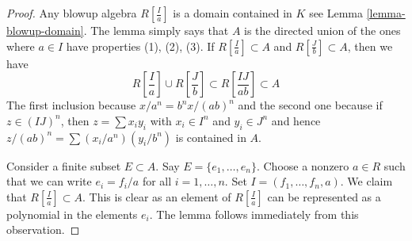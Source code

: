 \begin{proof}
Any blowup algebra $R[\frac{I}{a}]$ is a domain contained in $K$ see
Lemma \ref{lemma-blowup-domain}. The lemma simply says that $A$ is the
directed union of the ones where $a \in I$ have properties (1), (2), (3).
If $R[\frac{I}{a}] \subset A$ and $R[\frac{J}{b}] \subset A$, then
we have
$$
R[\textstyle{\frac{I}{a}}] \cup R[\textstyle{\frac{J}{b}}]  \subset
R[\textstyle{\frac{IJ}{ab}}] \subset A
$$
The first inclusion because $x/a^n = b^nx/(ab)^n$ and the second one
because if $z \in (IJ)^n$, then $z = \sum x_iy_i$ with $x_i \in I^n$
and $y_i \in J^n$ and hence $z/(ab)^n = \sum (x_i/a^n)(y_i/b^n)$
is contained in $A$.

\medskip\noindent
Consider a finite subset $E \subset A$. Say $E = \{e_1, \ldots, e_n\}$.
Choose a nonzero $a \in R$ such that we can write $e_i = f_i/a$ for
all $i = 1, \ldots, n$. Set $I = (f_1, \ldots, f_n, a)$.
We claim that $R[\frac{I}{a}] \subset A$. This is clear as an element
of $R[\frac{I}{a}]$ can be represented as a polynomial in the elements
$e_i$. The lemma follows immediately from this observation.
\end{proof}










